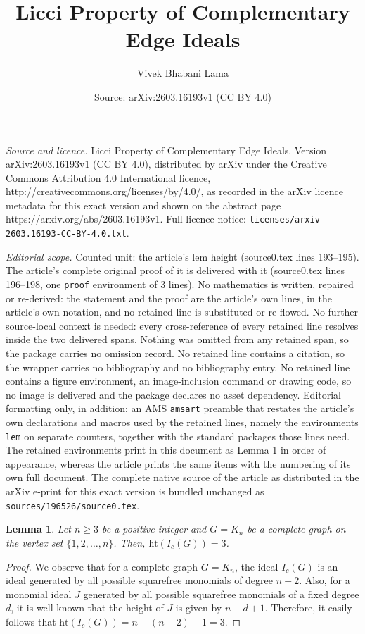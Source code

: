 \documentclass[10pt,a4paper]{amsart}
\title{Licci Property of Complementary Edge Ideals}
\author{Vivek Bhabani Lama}
\date{Source: arXiv:2603.16193v1 (CC BY 4.0)}
\newtheorem{lem}{Lemma}
\begin{document}
\maketitle

\noindent\emph{Source and licence.} Licci Property of Complementary Edge Ideals. Version arXiv:2603.16193v1 (CC BY 4.0), distributed by arXiv under the Creative Commons Attribution 4.0 International licence, http://creativecommons.org/licenses/by/4.0/, as recorded in the arXiv licence metadata for this exact version and shown on the abstract page https://arxiv.org/abs/2603.16193v1. Full licence notice: \texttt{licenses/arxiv-2603.16193-CC-BY-4.0.txt}.\par\smallskip

\noindent\textit{Editorial scope.} Counted unit: the article's lem height (source0.tex lines 193--195). The article's complete original proof of it is delivered with it (source0.tex lines 196--198, one \texttt{proof} environment of 3 lines). No mathematics is written, repaired or re-derived: the statement and the proof are the article's own lines, in the article's own notation, and no retained line is substituted or re-flowed.  No further source-local context is needed: every cross-reference of every retained line resolves inside the two delivered spans.  Nothing was omitted from any retained span, so the package carries no omission record.  No retained line contains a citation, so the wrapper carries no bibliography and no bibliography entry.  No retained line contains a figure environment, an image-inclusion command or drawing code, so no image is delivered and the package declares no asset dependency.  Editorial formatting only, in addition: an AMS \texttt{amsart} preamble that restates the article's own declarations and macros used by the retained lines, namely the environments \texttt{lem} on separate counters, together with the standard packages those lines need.  The retained environments print in this document as Lemma 1 in order of appearance, whereas the article prints the same items with the numbering of its own full document.  The complete native source of the article as distributed in the arXiv e-print for this exact version is bundled unchanged as \texttt{sources/196526/source0.tex}.
\begin{lem}\label{lemma on height}
Let $n\geq 3$ be a positive integer and $G=K_n$ be a complete graph on the vertex set $\{1,2,\dots,n\}$. Then, $\mathrm{ht}(I_c(G))=3$.   
\end{lem}

\begin{proof}
 We observe that for a complete graph $G=K_n$, the ideal $I_c(G)$ is an ideal generated by all possible squarefree monomials of degree $n-2$. Also, for a monomial ideal $J$ generated by all possible squarefree monomials of a fixed degree $d$, it is well-known that the height of $J$ is given by $n-d+1$. Therefore, it easily follows that $\mathrm{ht}(I_c(G))=n-(n-2)+1=3$.     
\end{proof}
\end{document}
